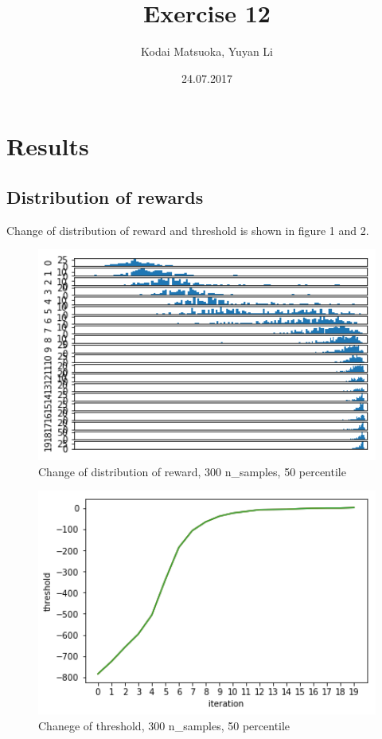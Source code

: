 \documentclass[12pt,a4paper]{scrartcl}
\author{Kodai Matsuoka, Yuyan Li}
\title{Exercise 12}
\date{24.07.2017}
\begin{document}
\maketitle

\section{Results}

\subsection{Distribution of rewards}
Change of distribution of reward and threshold is shown in figure 1 and 2.

\begin{figure}
	\centering
	\caption{Change of distribution of reward, 300 n\_samples, 50 percentile}
   \includegraphics[width=15cm]{result1.png}
\end{figure}


\begin{figure}
	\centering
	\caption{Chanege of threshold, 300 n\_samples, 50 percentile}
    \includegraphics[width=15cm]{result2.png}
\end{figure}
\end{document}
